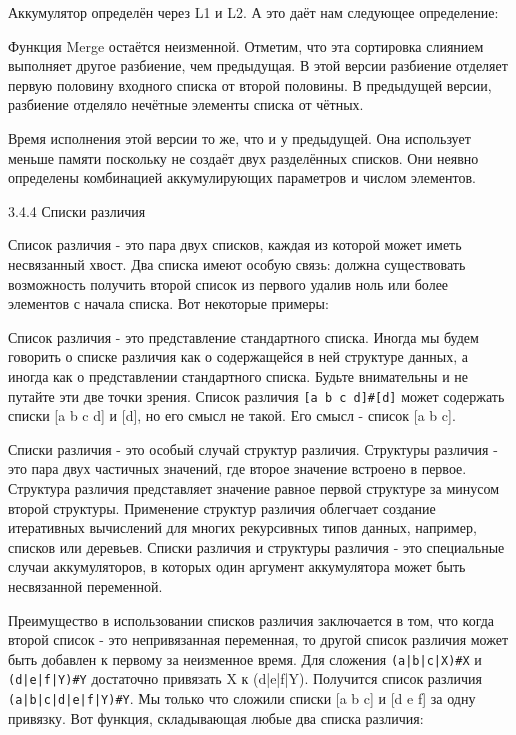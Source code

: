 Аккумулятор определён через L1 и L2. А это даёт нам следующее определение:

Функция Merge остаётся неизменной. Отметим, что эта сортировка слиянием выполняет другое разбиение, чем предыдущая. В этой версии разбиение отделяет первую половину входного списка от второй половины. В предыдущей версии, разбиение отделяло нечётные элементы списка от чётных.

Время исполнения этой версии то же, что и у предыдущей. Она использует меньше памяти поскольку не создаёт двух разделённых списков. Они неявно определены комбинацией аккумулирующих параметров и числом элементов.

3.4.4 Списки различия

Список различия - это пара двух списков, каждая из которой может иметь несвязанный хвост. Два списка имеют особую связь: должна существовать возможность получить второй список из первого удалив ноль или более элементов с начала списка. Вот некоторые примеры:


Список различия - это представление стандартного списка. Иногда мы будем говорить о списке различия как о содержащейся в ней структуре данных, а иногда как о представлении стандартного списка. Будьте внимательны и не путайте эти две точки зрения. Список различия \verb|[a b c d]#[d]| может содержать списки [a b c d] и [d], но его смысл не такой. Его смысл - список [a b c].

Списки различия - это особый случай структур различия. Структуры различия - это пара двух частичных значений, где второе значение встроено в первое. Структура различия представляет значение равное первой структуре за минусом второй структуры. Применение структур различия облегчает создание итеративных вычислений для многих рекурсивных типов данных, например, списков или деревьев. Списки различия и структуры различия - это специальные случаи аккумуляторов, в которых один аргумент аккумулятора может быть несвязанной переменной.

Преимущество в использовании списков различия заключается в том, что когда второй список - это непривязанная переменная, то другой список различия может быть добавлен к первому за неизменное время. Для сложения \verb!(a|b|c|X)#X! и \verb!(d|e|f|Y)#Y! достаточно привязать X к (d|e|f|Y). Получится список различия \verb!(a|b|c|d|e|f|Y)#Y!. Мы только что сложили списки [a b c] и [d e f] за одну привязку. Вот функция, складывающая любые два списка различия:


